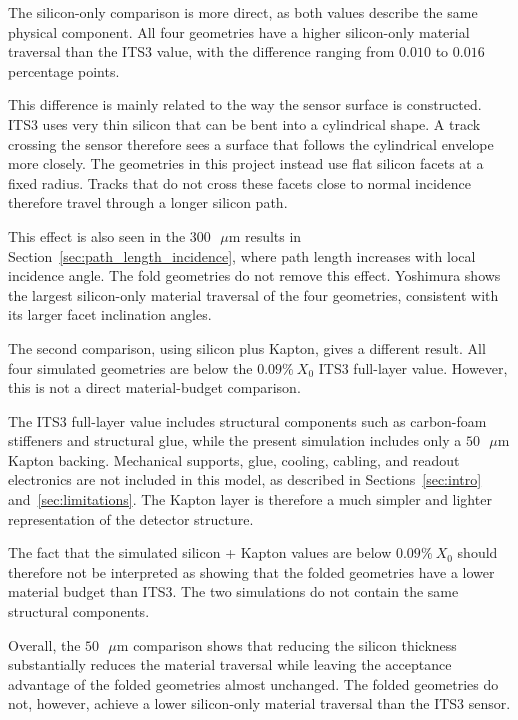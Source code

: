 \documentclass[a4paper,11pt]{article}
\begin{document}
The silicon-only comparison is more direct, as both values describe the same physical component. All four geometries have a higher silicon-only material traversal than the ITS3 value, with the difference ranging from $0.010$ to $0.016$ percentage points.

This difference is mainly related to the way the sensor surface is constructed. ITS3 uses very thin silicon that can be bent into a cylindrical shape. A track crossing the sensor therefore sees a surface that follows the cylindrical envelope more closely. The geometries in this project instead use flat silicon facets at a fixed radius. Tracks that do not cross these facets close to normal incidence therefore travel through a longer silicon path.

This effect is also seen in the $300\text{ }\mu\text{m}$ results in Section~\ref{sec:path_length_incidence}, where path length increases with local incidence angle. The fold geometries do not remove this effect. Yoshimura shows the largest silicon-only material traversal of the four geometries, consistent with its larger facet inclination angles.

The second comparison, using silicon plus Kapton, gives a different result. All four simulated geometries are below the $0.09\%\ X_0$ ITS3 full-layer value. However, this is not a direct material-budget comparison.

The ITS3 full-layer value includes structural components such as carbon-foam stiffeners and structural glue, while the present simulation includes only a $50\text{ }\mu\text{m}$ Kapton backing. Mechanical supports, glue, cooling, cabling, and readout electronics are not included in this model, as described in Sections~\ref{sec:intro} and~\ref{sec:limitations}. The Kapton layer is therefore a much simpler and lighter representation of the detector structure.

The fact that the simulated silicon + Kapton values are below $0.09\%\ X_0$ should therefore not be interpreted as showing that the folded geometries have a lower material budget than ITS3. The two simulations do not contain the same structural components.

Overall, the $50\text{ }\mu\text{m}$ comparison shows that reducing the silicon thickness substantially reduces the material traversal while leaving the acceptance advantage of the folded geometries almost unchanged. The folded geometries do not, however, achieve a lower silicon-only material traversal than the ITS3 sensor.
\end{document}
